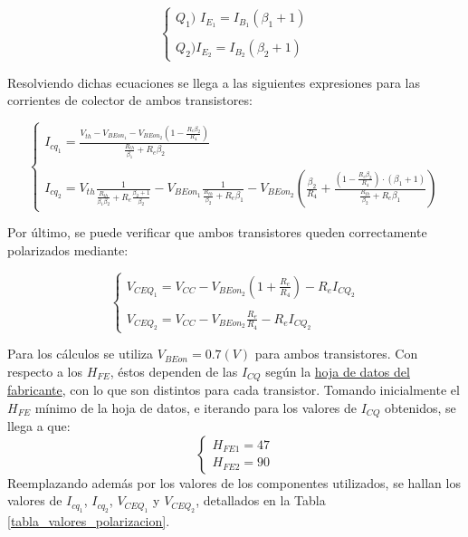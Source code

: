 	\begin{equation}
		\begin{cases}
		Q_{1}) \, \, I_{E_{1}} = I_{B_{1}}(\beta_{1}+1)\\ \\
		Q_{2}) I_{E_{2}}=I_{B_{2}}(\beta_{2}+1)
		\end{cases}
	\end{equation}

Resolviendo dichas ecuaciones se llega a las siguientes expresiones para las corrientes de colector de ambos transistores:

	\begin{equation}
		\begin{cases}
		I_{cq_{1}}=\frac{V_{th}-V_{BEon_{1}}-V_{BEon_{2}}\left(1-\frac{R_{e}\beta_{2}}{R_{4}}\right)}{\frac{R_{th}}{\beta_{1}}+R_{e}\beta_{2}}\\ \\
		I_{cq_{2}}=V_{th}\frac{1}{\frac{R_{th}}{\beta_{1}\beta_{2}}+R_{e}\frac{\beta_{2}+1}{\beta_{2}}}-V_{BEon_{1}}\frac{1}{\frac{R_{th}}{\beta_{2}}+R_{e}\beta_{1}}-V_{BEon_{2}}\left(\frac{\beta_{2}}{R_{4}}+\frac{\left(1-\frac{R_{e}\beta_{2}}{R_{4}}\right)\cdot(\beta_{1}+1)}{\frac{R_{th}}{\beta_{2}}+R_{e}\beta_{1}} \right)
		\end{cases}
	\end{equation}

Por último, se puede verificar que ambos transistores queden correctamente polarizados mediante:

	\begin{equation}
		\begin{cases}
		V_{CEQ_{1}}=V_{CC}-V_{BEon_{2}}\left(1+\frac{R_{e}}{R_{4}}\right)-R_{e}I_{CQ_{2}}\\ \\
		V_{CEQ_{2}}=V_{CC}-V_{BEon_{2}}\frac{R_{e}}{R_{4}}-R_{e}I_{CQ_{2}}
		\end{cases}
	\end{equation}
	

Para los cálculos se utiliza $V_{BEon}=0.7(V)$ para ambos transistores. Con respecto a los $H_{FE}$, éstos dependen de las $I_{CQ}$ según la \href{https://pdf1.alldatasheet.com/datasheet-pdf/view/171970/ONSEMI/BC337-40.html}{hoja de datos del fabricante}, con lo que son distintos para cada transistor. Tomando inicialmente el $H_{FE}$ mínimo de la hoja de datos, e iterando para los valores de $I_{CQ}$ obtenidos, se llega a que:
	\begin{equation*}
		\begin{cases}
		 H_{FE1} = 47\\
		 H_{FE2} = 90
		\end{cases}
	\end{equation*}
Reemplazando además por los valores de los componentes utilizados, se hallan los valores de $I_{cq_{1}}$, $I_{cq_{2}}$, $V_{CEQ_{1}}$ y $V_{CEQ_{2}}$, detallados en la Tabla \ref{tabla_valores_polarizacion}.

